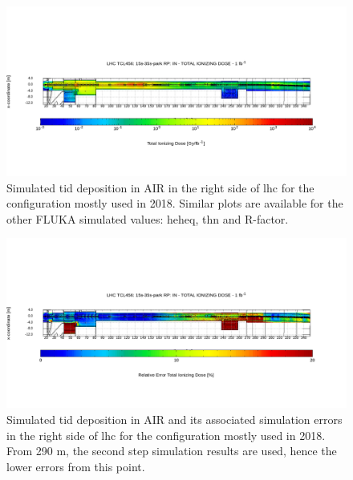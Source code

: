 \documentclass[encoding=utf8,british]{tumphthesis}
\begin{document}
\begin{landscape}

\begin{figure}[H]
\centering
   \includegraphics[width=1.0\linewidth]{results/quantity_tid.png}
    \caption{Simulated \acrshort{tid} deposition in AIR in the right side of \acrshort{lhc} for the configuration mostly used in 2018. Similar plots are available for the other FLUKA simulated values: \acrshort{heheq}, \acrshort{thn} and R-factor.}
   \label{fig:2D-TID-tunnel} 
\end{figure}
\end{landscape}

\begin{landscape}
\begin{figure}[H]
   \includegraphics[width=1.0\linewidth]{results/quantity_TID_errors.png}
    \caption{Simulated \acrshort{tid} deposition in AIR and its associated simulation errors in the right side of \acrshort{lhc} for the configuration mostly used in 2018.  From 290 m, the second step simulation results are used, hence the lower errors from this point.}
    \label{fig:2D-TID-tunnel-errors}

\end{figure}
\end{landscape}
\end{document}
